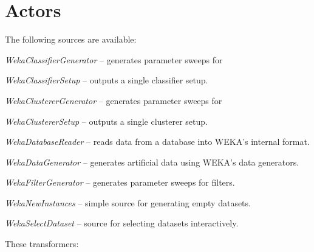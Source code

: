 \section{Actors}
The following sources are available:
\begin{tight_itemize}
	\item \textit{WekaClassifierGenerator} -- generates parameter sweeps for
	\item \textit{WekaClassifierSetup} -- outputs a single classifier setup.
	\item \textit{WekaClustererGenerator} -- generates parameter sweeps for
	\item \textit{WekaClustererSetup} -- outputs a single clusterer setup.
	\item \textit{WekaDatabaseReader} -- reads data from a database into
	WEKA's internal format.
	\item \textit{WekaDataGenerator} -- generates artificial data using WEKA's
	data generators.
	\item \textit{WekaFilterGenerator} -- generates parameter sweeps for
	filters.
	\item \textit{WekaNewInstances} -- simple source for generating empty 
	datasets.
	\item \textit{WekaSelectDataset} -- source for selecting datasets interactively.
\end{tight_itemize}
These transformers:
